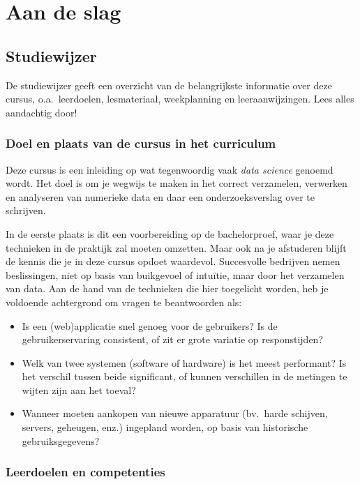 \chapter{Aan de slag}
\label{ch:aan-de-slag}

\section{Studiewijzer}

De studiewijzer geeft een overzicht van de belangrijkste informatie over deze cursus, o.a.~leerdoelen, lesmateriaal, weekplanning en leeraanwijzingen. Lees alles aandachtig door!

\subsection{Doel en plaats van de cursus in het curriculum}

Deze cursus is een inleiding op wat tegenwoordig vaak \emph{data science} genoemd wordt. Het doel is om je wegwijs te maken in het correct verzamelen, verwerken en analyseren van numerieke data en daar een onderzoeksverslag over te schrijven.

In de eerste plaats is dit een voorbereiding op de bachelorproef, waar je deze technieken in de praktijk zal moeten omzetten. Maar ook na je afstuderen blijft de kennis die je in deze cursus opdoet waardevol. Succesvolle bedrijven nemen beslissingen, niet op basis van buikgevoel of intuïtie, maar door het verzamelen van data. Aan de hand van de technieken die hier toegelicht worden, heb je voldoende achtergrond om vragen te beantwoorden als:

\begin{itemize}
  \item Is een (web)applicatie snel genoeg voor de gebruikers? Is de gebruikerservaring consistent, of zit er grote variatie op responstijden?
  \item Welk van twee systemen (software of hardware) is het meest performant? Is het verschil tussen beide significant, of kunnen verschillen in de metingen te wijten zijn aan het toeval?
  \item Wanneer moeten aankopen van nieuwe apparatuur (bv.~harde schijven, servers, geheugen, enz.) ingepland worden, op basis van historische gebruiksgegevens?
\end{itemize}

\subsection{Leerdoelen en competenties}

